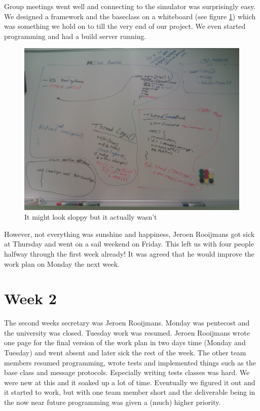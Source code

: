 \documentclass[a4paper,10pt]{article}
\begin{document}
Group meetings went well and connecting to the simulator was surprisingly easy. We designed a framework and the
baseclass on a whiteboard (see figure \ref{fig:whiteboard}) which was something we hold on to till the very end
of our project. We even started programming and had a build server running.

\begin{figure}[h]
\centering
\includegraphics[width=12cm]{whiteboard}
\caption{It might look sloppy but it actually wasn't}
\label{fig:whiteboard}
\end{figure}

However, not everything was sunshine and happiness, Jeroen Rooijmans got sick at Thursday and went on a sail 
weekend on Friday. This left us with four people halfway through the first week already! It 
was agreed that he would improve the work plan on Monday the next week. 

\section{Week 2}
The second weeks secretary was Jeroen Rooijmans. Monday was pentecost and the university was closed. 
Tuesday work was resumed. Jeroen Rooijmans wrote one page for the final version of the work plan in two days time 
(Monday and Tuesday) and went absent and later sick the rest of the week. The other team members resumed
programming, wrote tests and implemented things such as the base class and message protocols. Especially writing tests 
classes was hard.
We were new at this and it soaked up a lot of time. Eventually we figured it out and
it started to work, but with one
team member short and the deliverable being in the now near future programming was given a (much) higher
priority. 
\end{document}
